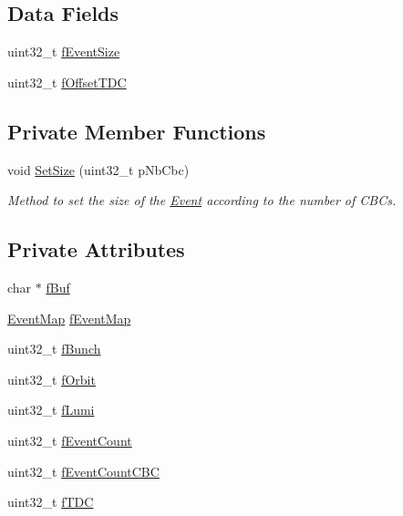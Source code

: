 \subsection*{Data Fields}
\begin{CompactItemize}
\item 
uint32\_\-t \hyperlink{class_ph2___hw_interface_1_1_event_0a12db10e67652851517cc65c8057667}{f\-Event\-Size}
\item 
uint32\_\-t \hyperlink{class_ph2___hw_interface_1_1_event_fd3160b2830469808d9f671bfbedfd55}{f\-Offset\-TDC}
\end{CompactItemize}
\subsection*{Private Member Functions}
\begin{CompactItemize}
\item 
void \hyperlink{class_ph2___hw_interface_1_1_event_2a9e8d866e4d8c4fe91ea8320b931047}{Set\-Size} (uint32\_\-t p\-Nb\-Cbc)
\begin{CompactList}\small\item\em Method to set the size of the \hyperlink{class_ph2___hw_interface_1_1_event}{Event} according to the number of CBCs. \item\end{CompactList}\end{CompactItemize}
\subsection*{Private Attributes}
\begin{CompactItemize}
\item 
char $\ast$ \hyperlink{class_ph2___hw_interface_1_1_event_b396cf1480f11b535d0e464aa6f9f046}{f\-Buf}
\item 
\hyperlink{namespace_ph2___hw_interface_cf9f41d647e7a3ad9bae233b04b9e3bc}{Event\-Map} \hyperlink{class_ph2___hw_interface_1_1_event_ce9844f1fc14895f880ed111c705d392}{f\-Event\-Map}
\item 
uint32\_\-t \hyperlink{class_ph2___hw_interface_1_1_event_e5b69f2e0a9c9c947f7a37b7dcf380dc}{f\-Bunch}
\item 
uint32\_\-t \hyperlink{class_ph2___hw_interface_1_1_event_6aa6c402d2b16e735fbb4b7518c2666e}{f\-Orbit}
\item 
uint32\_\-t \hyperlink{class_ph2___hw_interface_1_1_event_78afd0886560acf70ee6b982c5690e0a}{f\-Lumi}
\item 
uint32\_\-t \hyperlink{class_ph2___hw_interface_1_1_event_dd8f3a445ae11e54b47af7690074a4ce}{f\-Event\-Count}
\item 
uint32\_\-t \hyperlink{class_ph2___hw_interface_1_1_event_c61b0e2c53e5d4228d43132f470dfdac}{f\-Event\-Count\-CBC}
\item 
uint32\_\-t \hyperlink{class_ph2___hw_interface_1_1_event_b91638311238d12f1cd258556c8d1d80}{f\-TDC}
\end{CompactItemize}

